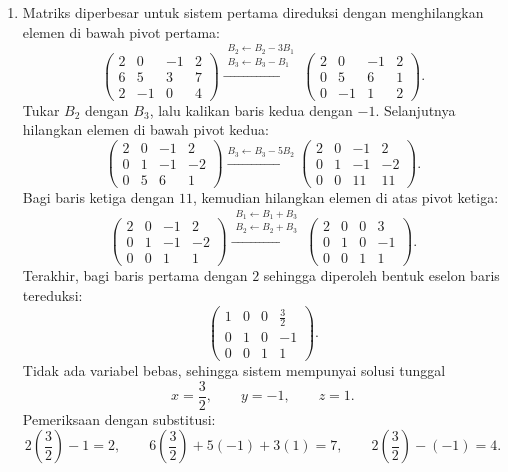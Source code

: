 \documentclass[11pt,a4paper]{article}
\begin{document}
\begin{enumerate}
\begin{enumerate}
\item
Matriks diperbesar untuk sistem pertama direduksi dengan menghilangkan
elemen di bawah pivot pertama:
\[
    \left(\begin{array}{ccc|c}
        2&0&-1&2\\
        6&5&3&7\\
        2&-1&0&4
    \end{array}\right)
    \xrightarrow{\substack{B_2\leftarrow B_2-3B_1\\
                            B_3\leftarrow B_3-B_1}}
    \left(\begin{array}{ccc|c}
        2&0&-1&2\\
        0&5&6&1\\
        0&-1&1&2
    \end{array}\right).
\]
Tukar $B_2$ dengan $B_3$, lalu kalikan baris kedua dengan $-1$.
Selanjutnya hilangkan elemen di bawah pivot kedua:
\[
    \left(\begin{array}{ccc|c}
        2&0&-1&2\\
        0&1&-1&-2\\
        0&5&6&1
    \end{array}\right)
    \xrightarrow{B_3\leftarrow B_3-5B_2}
    \left(\begin{array}{ccc|c}
        2&0&-1&2\\
        0&1&-1&-2\\
        0&0&11&11
    \end{array}\right).
\]
Bagi baris ketiga dengan $11$, kemudian hilangkan elemen di atas
pivot ketiga:
\[
    \left(\begin{array}{ccc|c}
        2&0&-1&2\\
        0&1&-1&-2\\
        0&0&1&1
    \end{array}\right)
    \xrightarrow{\substack{B_1\leftarrow B_1+B_3\\
                            B_2\leftarrow B_2+B_3}}
    \left(\begin{array}{ccc|c}
        2&0&0&3\\
        0&1&0&-1\\
        0&0&1&1
    \end{array}\right).
\]
Terakhir, bagi baris pertama dengan $2$ sehingga diperoleh bentuk
eselon baris tereduksi:
\[
    \left(\begin{array}{ccc|c}
        1&0&0&\frac32\\
        0&1&0&-1\\
        0&0&1&1
    \end{array}\right).
\]
Tidak ada variabel bebas, sehingga sistem mempunyai solusi tunggal
\[
    \boxed{x=\frac32,\qquad y=-1,\qquad z=1}.
\]
Pemeriksaan dengan substitusi:
\[
    2\left(\frac32\right)-1=2,\qquad
    6\left(\frac32\right)+5(-1)+3(1)=7,\qquad
    2\left(\frac32\right)-(-1)=4.
\]


\end{enumerate}
\end{enumerate}
\end{document}
